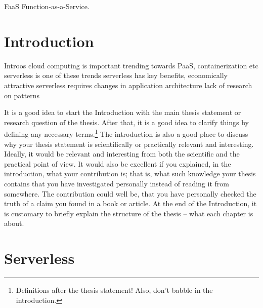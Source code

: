 \documentclass[utf8,english]{gradu3}
\begin{document}




\begin{thetermlist}
\item[FaaS] Function-as-a-Service.
\end{thetermlist}

\mainmatter

\chapter{Introduction}

Introos \parencite{adzic2017serverless}
cloud computing is important
trending towards PaaS, containerization etc
serverless is one of these trends
serverless has key benefits, economically attractive
serverless requires changes in application architecture
lack of research on patterns

It is a good idea to start the Introduction with the main thesis
statement or research question of the thesis.  After that, it is a
good idea to clarify things by defining any necessary
terms.\footnote{Definitions after the thesis statement!  Also, don't
  babble in the introduction.}  The introduction is also a good place
to discuss why your thesis statement is scientifically or practically
relevant and interesting.  Ideally, it would be relevant and
interesting from both the scientific and the practical point of view.
It would also be excellent if you explained, in the introduction, what
your contribution is; that is, what such knowledge your thesis
contains that you have investigated personally instead of reading it
from somewhere.  The contribution could well be, that you have
personally checked the truth of a claim you found in a book or
article.  At the end of the Introduction, it is customary to briefly
explain the structure of the thesis -- what each chapter is about.

\chapter{Serverless}
\end{document}
